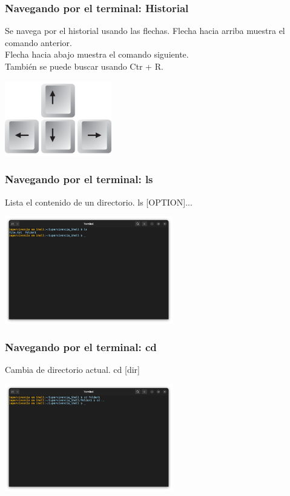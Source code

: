 \documentclass[10pt]{beamer}
\begin{document}
	\begin{frame}
		\frametitle{Navegando por el terminal: Historial}
		\begin{alertblock}{Se navega por el historial usando las flechas.}
			Flecha hacia arriba muestra el comando anterior.\\
			Flecha hacia abajo muestra el comando siguiente.\\
			También se puede buscar usando Ctr + R.
		\end{alertblock}
		\begin{center}
			\includegraphics[width=0.35\textwidth]{keys}
		\end{center}
	\end{frame}
	
	\begin{frame}
		\frametitle{Navegando por el terminal: ls}
		\begin{alertblock}{Lista el contenido de un directorio.}
			ls [OPTION]...
		\end{alertblock}
		\begin{center}
			\includegraphics[width=0.55\textwidth]{ls}
		\end{center}
	\end{frame}
	
	\begin{frame}
		\frametitle{Navegando por el terminal: cd}
		\begin{alertblock}{Cambia de directorio actual.}
			cd [dir]
		\end{alertblock}
		\begin{center}
			\includegraphics[width=0.55\textwidth]{cd}
		\end{center}
	\end{frame}
	
\end{document}
